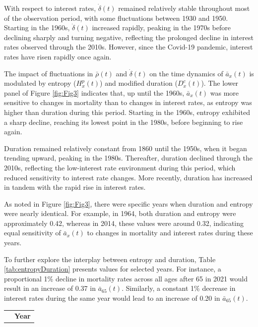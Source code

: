 \documentclass[12pt]{article}
\begin{document}
{With respect to interest rates, \( \dot{\delta}(t) \) remained relatively stable throughout most of the observation period, with some fluctuations between 1930 and 1950. Starting in the 1960s, \( \dot{\delta}(t) \) increased rapidly, peaking in the 1970s before declining sharply and turning negative, reflecting the prolonged decline in interest rates observed through the 2010s. However, since the Covid-19 pandemic, interest rates have risen rapidly once again.


The impact of fluctuations in \( \bar{\rho}(t) \) and \( \dot{\delta}(t) \) on the time dynamics of \( \bar{a}_x(t) \) is modulated by entropy (\( {H}^{p}_x(t) \)) and modified duration (\( {D}^{c}_x(t) \)). The lower panel of Figure \ref{fig:Fig3} indicates that, up until the 1960s, \( \bar{a}_x(t) \) was more sensitive to changes in mortality than to changes in interest rates, as entropy was higher than duration during this period. Starting in the 1960s, entropy exhibited a sharp decline, reaching its lowest point in the 1980s, before beginning to rise again.

Duration remained relatively constant from 1860 until the 1950s, when it began trending upward, peaking in the 1980s. Thereafter, duration declined through the 2010s, reflecting the low-interest rate environment during this period, which reduced sensitivity to interest rate changes. More recently, duration has increased in tandem with the rapid rise in interest rates.

As noted in Figure \ref{fig:Fig3}, there were specific years when duration and entropy were nearly identical. For example, in 1964, both duration and entropy were approximately 0.42, whereas in 2014, these values were around 0.32, indicating equal sensitivity of \( \bar{a}_x(t) \) to changes in mortality and interest rates during these years.

To further explore the interplay between entropy and duration, Table \ref{tab:entropyDuration} presents values for selected years. For instance, a proportional 1\% decline in mortality rates across all ages after 65 in 2021 would result in an increase of 0.37 in \( \bar{a}_{65}(t) \). Similarly, a constant 1\% decrease in interest rates during the same year would lead to an increase of 0.20 in \( \bar{a}_{65}(t) \).



\begin{table}[ht]
	\begin{tabular}{rccccc}
		\toprule
		& \multicolumn{5}{c}{\textbf{Year}}  \\


\end{tabular}
\end{table}}
\end{document}
